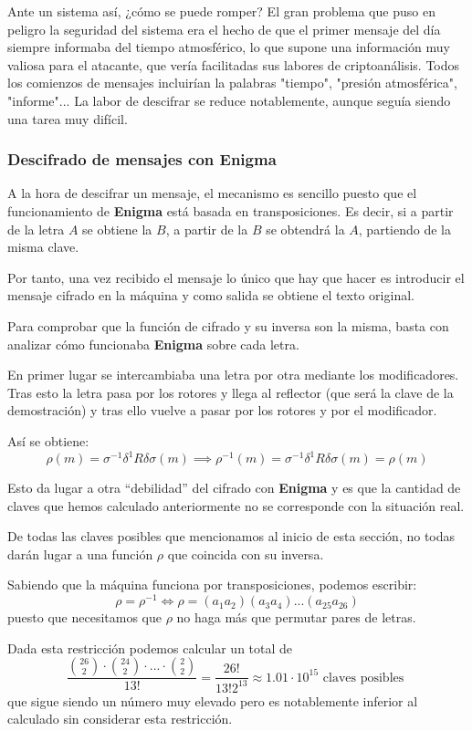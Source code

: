 \documentclass[nochap]{apuntesURJC}
\begin{document}
Ante un sistema así, ¿cómo se puede romper?
%
El gran problema que puso en peligro la seguridad del sistema era el hecho de que el primer mensaje del día siempre informaba del tiempo atmosférico, lo que supone una información muy valiosa para el atacante, que vería facilitadas sus labores de criptoanálisis.
%
Todos los comienzos de mensajes incluirían la palabras "tiempo", "presión atmosférica", "informe"... 
%
La labor de descifrar se reduce notablemente, aunque seguía siendo una tarea muy difícil.


\subsubsection{Descifrado de mensajes con Enigma}
A la hora de descifrar un mensaje, el mecanismo es sencillo puesto que el funcionamiento de \textbf{Enigma} está basada en transposiciones. Es decir, si a partir de la letra $A$ se obtiene la $B$, a partir de la $B$ se obtendrá la $A$, partiendo de la misma clave.

Por tanto, una vez recibido el mensaje lo único que hay que hacer es introducir el mensaje cifrado en la máquina y como salida se obtiene el texto original.

Para comprobar que la función de cifrado y su inversa son la misma, basta con analizar cómo funcionaba \textbf{Enigma} sobre cada letra.

En primer lugar se intercambiaba una letra por otra mediante los modificadores. Tras esto la letra pasa por los rotores y llega al reflector (que será la clave de la demostración) y tras ello vuelve a pasar por los rotores y por el modificador.

Así se obtiene:
\[\rho(m) = σ^{-1}δ^{1}Rδσ(m) \implies \rho^{-1}(m) = σ^{-1}δ^{1}Rδσ(m) = \rho(m)\]

Esto da lugar a otra ``debilidad'' del cifrado con \textbf{Enigma} y es que la cantidad de claves que hemos calculado anteriormente no se corresponde con la situación real.

De todas las claves posibles que mencionamos al inicio de esta sección, no todas darán lugar a una función $\rho$ que coincida con su inversa.

Sabiendo que la máquina funciona por transposiciones, podemos escribir:
\[\rho = \rho^{-1} \iff \rho = (a_1a_2)(a_3a_4)...(a_{25}a_{26})\]
puesto que necesitamos que $\rho$ no haga más que permutar pares de letras.

Dada esta restricción podemos calcular un total de
\[\frac{{26 \choose 2} \cdot {24 \choose 2} \cdot ... \cdot {2 \choose 2}}{13!} =\frac{26!}{13!2^{13}} \approx 1.01 \cdot 10^{15} \text{ claves posibles }\]
que sigue siendo un número muy elevado pero es notablemente inferior al calculado sin considerar esta restricción.
\end{document}

